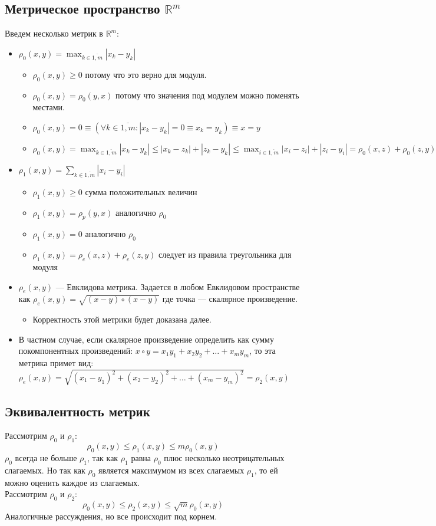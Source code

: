\subsection{Метрическое пространство $\mathbb{R}^m$}
Введем несколько метрик в $\mathbb{R}^m$:
\begin{itemize}
    \item $\rho_0(x, y) = \max_{k \in \overline{1, m}} |x_k - y_k|$
    \begin{itemize}
        \item $\rho_0(x, y) \geq 0$ потому что это верно для модуля.
        \item $\rho_0(x,y) = \rho_0(y, x)$ потому что значения под модулем можно поменять местами.
        \item $\rho_0(x, y) = 0 \equiv
        (\forall k \in \overline{1, m} : |x_k - y_k| = 0 \equiv x_k = y_k)
        \equiv x = y$
        \item $\rho_0(x, y) = 
        \max_{k \in \overline{1, m}} |x_k - y_k| \leq
        |x_k - z_k| + |z_k - y_k| \leq
        \max_{i \in \overline{1, m}} |x_i - z_i| + |z_i - y_i| =
        \rho_0(x, z) + \rho_0(z, y)$
    \end{itemize}
    \item $\rho_1(x, y) = \sum_{k \in \overline{1, m}} |x_i - y_i|$
    \begin{itemize}
        \item $\rho_1(x, y) \geq 0$ сумма положительных величин
        \item $\rho_1(x,y) = \rho_p(y, x)$ аналогично $\rho_0$
        \item $\rho_1(x, y) = 0$ аналогично $\rho_0$
        \item $\rho_1(x, y) = \rho_e(x, z) + \rho_e(z, y)$ следует из правила треугольника для модуля
    \end{itemize}
    \item $\rho_e(x, y)$ --- Евклидова метрика. Задается в любом Евклидовом пространстве как $\rho_e(x, y) = \sqrt{(x-y) \circ (x-y)}$ где точка --- скалярное произведение.
    \begin{itemize}
        \item Корректность этой метрики будет доказана далее.
    \end{itemize}
    \item В частном случае, если скалярное произведение определить как сумму покомпонентных произведений: $x \circ y = x_1y_1 + x_2y_2 + \dots + x_my_m$, то эта метрика примет вид: $\rho_e(x, y) = \sqrt{(x_1 - y_1)^2 + (x_2 - y_2)^2 + \dots + (x_m - y_m)^2} = \rho_2(x, y)$
\end{itemize}
\subsection{Эквивалентность метрик}
Рассмотрим $\rho_0$ и $\rho_1$:
$$
\rho_0(x,y) \leq \rho_1(x,y) \leq m\rho_0(x,y)
$$
$\rho_0$ всегда не больше $\rho_1$, так как $\rho_1$ равна $\rho_0$ плюс несколько неотрицательных слагаемых. Но так как $\rho_0$ является максимумом из всех слагаемых $\rho_1$, то ей можно оценить каждое из слагаемых. \\
Рассмотрим $\rho_0$ и $\rho_2$:
$$
\rho_0(x,y) \leq \rho_2(x,y) \leq \sqrt{m} \rho_0(x,y)
$$
Аналогичные рассуждения, но все происходит под корнем.
